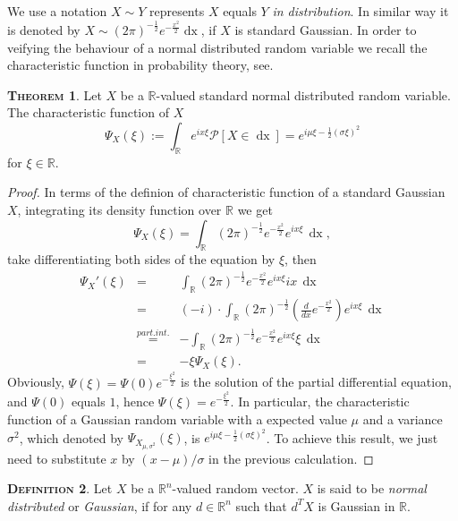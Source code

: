 \documentclass[a4paper, twoside, 11pt]{article}
\theoremstyle{definition}
\newtheorem{definition}{\scshape Definition}[section]
\newtheorem{theorem}[definition]{\scshape Theorem}
\newcommand{\sqbr}[1]{\left[ {#1} \right]}
\begin{document}
We use a notation $X \sim Y$ represents $X$ equals $Y$ \emph{in distribution}. In similar way it is denoted by $X \sim (2\pi)^{-\frac{1}{2}}e^{-\frac{x^2}{2}}\mathop{dx} $, if $X$ is standard Gaussian. In order to veifying the behaviour of a normal distributed random variable we recall the characteristic function in probability theory, see\cite{bauer}. 

\begin{theorem}
  Let $X$ be a $\mathbb{R}$-valued standard normal distributed random variable. The characteristic function of $X$
\begin{equation}
  \Psi_X(\xi) := \int_\mathbb{R} e^{ix\xi}\mathcal{P}\sqbr{X \in \mathop{dx}} = e^{i\mu\xi-\frac{1}{2}(\sigma\xi)^2}
  \label{sec:cht}
\end{equation}
for $\xi \in \mathbb{R}$.
\label{sec:char}
\end{theorem}
\begin{proof}
  In terms of the definion of characteristic function of a standard Gaussian $X$, integrating its density function over $\mathbb{R}$ we get
  \begin{equation*}
	\Psi_X(\xi) = \int_\mathbb{R} (2\pi)^{-\frac{1}{2}}e^{-\frac{x^2}{2}}e^{ix\xi}\,\mathop{dx},
  \end{equation*}
take differentiating both sides of the equation by $\xi$, then
\begin{eqnarray*}
\Psi_X'(\xi) &=& \int_\mathbb{R}(2\pi)^{-\frac{1}{2}}e^{-\frac{x^2}{2}}e^{ix\xi}ix\,\mathop{dx}\\
             &=& (-i)\cdot\int_\mathbb{R} (2\pi)^{-\frac{1}{2}}(\frac{d}{dx}e^{-\frac{x^2}{2}})e^{ix\xi}\,\mathop{dx}\\
			 &\overset{part.int.}{=}& -\int_\mathbb{R}(2\pi)^{-\frac{1}{2}}e^{-\frac{x^2}{2}}e^{ix\xi}\xi\,\mathop{dx}\\
			 &=& -\xi\Psi_X(\xi).
\end{eqnarray*}
Obviously, 
$\Psi(\xi) = \Psi(0)e^{-\frac{\xi^2}{2}}$ is the solution of the partial differential equation, and $\Psi(0)$ equals $1$, hence $\Psi(\xi) = e^{-\frac{\xi^2}{2}}$.
In particular, the characteristic function of a Gaussian random variable with a expected value $\mu$ and a variance $\sigma^2$, which denoted by $\Psi_{X_{\mu,\sigma^2}}(\xi)$, is $e^{i\mu\xi-\frac{1}{2}(\sigma\xi)^2}$. To achieve this result, we just need to substitute $x$ by $(x-\mu)/\sigma$ in the previous calculation. 
\end{proof}

\begin{definition}
  Let $X$ be a $\mathbb{R}^{n}$-valued random vector. $X$ is said to be \emph{normal distributed} or \emph{Gaussian}, if for any $d \in \mathbb{R}^{n}$ such that $d^TX$ is Gaussian in $\mathbb{R}$.
  \label{sec:g1}
\end{definition}
\end{document}
